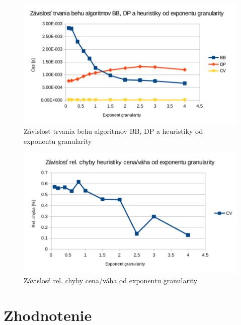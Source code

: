 \documentclass[slovak]{article}
\begin{document}
\begin{figure}[htb!]\centering
	\includegraphics[scale=0.8]{./3_7.pdf}
	\caption{Závislosť trvania behu algoritmov BB, DP a heuristiky od exponentu granularity}
	\label{gr:graf7}
\end{figure}

\begin{figure}[htb!]\centering
	\includegraphics[scale=0.8]{./3_8.pdf}
	\caption{Závislosť rel. chyby cena/váha od exponentu granularity}
	\label{gr:graf8}
\end{figure}

\section{Zhodnotenie}
\end{document}
